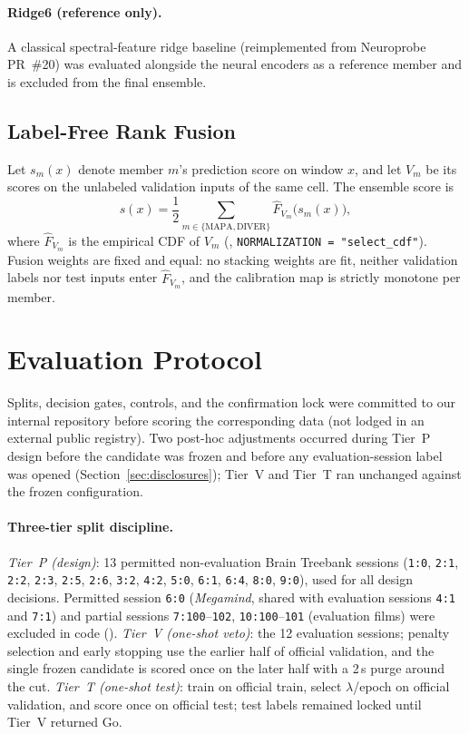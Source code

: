 \documentclass[11pt]{article}
\begin{document}
\paragraph{Ridge6 (reference only).}
A classical spectral-feature ridge baseline (reimplemented from Neuroprobe PR~\#20) was evaluated alongside the neural encoders as a reference member and is excluded from the final ensemble.

\subsection{Label-Free Rank Fusion}\label{sec:fusion}
Let $s_m(x)$ denote member $m$'s prediction score on window $x$, and let $V_m$ be its scores on the unlabeled validation inputs of the same cell. The ensemble score is
\begin{equation}
  s(x) = \frac{1}{2}\sum_{m\in\{\text{MAPA},\text{DIVER}\}} \hat F_{V_m}\big(s_m(x)\big),
\end{equation}
where $\hat F_{V_m}$ is the empirical CDF of $V_m$ (, \texttt{NORMALIZATION = "select\_cdf"}). Fusion weights are fixed and equal: no stacking weights are fit, neither validation labels nor test inputs enter $\hat F_{V_m}$, and the calibration map is strictly monotone per member.

\section{Evaluation Protocol}\label{sec:protocol}
Splits, decision gates, controls, and the confirmation lock were committed to our internal repository before scoring the corresponding data (not lodged in an external public registry). Two post-hoc adjustments occurred during Tier~P design before the candidate was frozen and before any evaluation-session label was opened (Section~\ref{sec:disclosures}); Tier~V and Tier~T ran unchanged against the frozen configuration.

\paragraph{Three-tier split discipline.}
\emph{Tier~P (design)}: 13 permitted non-evaluation Brain Treebank sessions (\texttt{1:0}, \texttt{2:1}, \texttt{2:2}, \texttt{2:3}, \texttt{2:5}, \texttt{2:6}, \texttt{3:2}, \texttt{4:2}, \texttt{5:0}, \texttt{6:1}, \texttt{6:4}, \texttt{8:0}, \texttt{9:0}), used for all design decisions. Permitted session \texttt{6:0} (\emph{Megamind}, shared with evaluation sessions \texttt{4:1} and \texttt{7:1}) and partial sessions \texttt{7:100}--\texttt{102}, \texttt{10:100}--\texttt{101} (evaluation films) were excluded in code ().
\emph{Tier~V (one-shot veto)}: the 12 evaluation sessions; penalty selection and early stopping use the earlier half of official validation, and the single frozen candidate is scored once on the later half with a 2\,s purge around the cut.
\emph{Tier~T (one-shot test)}: train on official train, select $\lambda$/epoch on official validation, and score once on official test; test labels remained locked until Tier~V returned Go.
\end{document}
